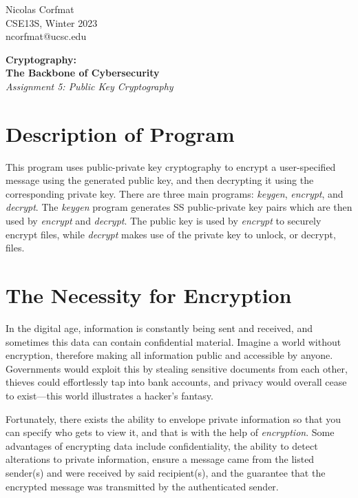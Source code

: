 \documentclass[12pt]{article}
\begin{document}
\flushright
Nicolas Corfmat \\CSE13S, Winter 2023 \\ ncorfmat@ucsc.edu

\flushleft
\LARGE
\textbf{Cryptography:\\The Backbone of Cybersecurity}
\large
\\\textit{Assignment 5: Public Key Cryptography}

\section{Description of Program}
\normalsize

This program uses public-private key cryptography to encrypt a user-specified message using the generated public key, and then decrypting it using the corresponding private key. There are three main programs: \textit{keygen}, \textit{encrypt}, and \textit{decrypt}. The \textit{keygen} program generates SS public-private key pairs which are then used by \textit{encrypt} and \textit{decrypt}. The public key is used by \textit{encrypt} to securely encrypt files, while \textit{decrypt} makes use of the private key to unlock, or decrypt, files.


\section{The Necessity for Encryption}

In the digital age, information is constantly being sent and received, and sometimes this data can contain confidential material. Imagine a world without encryption, therefore making all information public and accessible by anyone. Governments would exploit this by stealing sensitive documents from each other, thieves could effortlessly tap into bank accounts, and privacy would overall cease to exist---this world illustrates a hacker's fantasy.

\vspace{0.2in}

Fortunately, there exists the ability to envelope private information so that you can specify who gets to view it, and that is with the help of \textit{encryption}. Some advantages of encrypting data include confidentiality, the ability to detect alterations to private information, ensure a message came from the listed sender(s) and were received by said recipient(s), and the guarantee that the encrypted message was transmitted by the authenticated sender.
\end{document}
